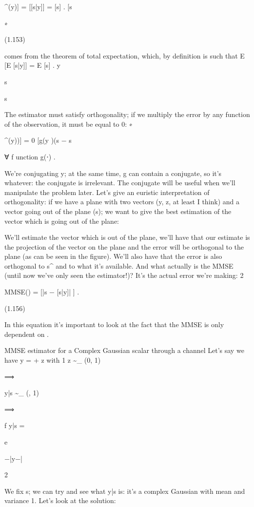 {^(y)] = [[s|y]] = [s] .
[s

∗

(1.153)

comes from the theorem of total expectation, which, by definition is such that E [E [s|y]] = E [s] .
y

s

s

The estimator must satisfy orthogonality; if we multiply the error by any function of the observation, it must be equal to 0:
∗

^(y))] = 0 [g(y )(s − s

∀ f unction g(⋅) .

We're conjugating y; at the same time, g can contain a conjugate, so it's whatever:
the conjugate is irrelevant.
The conjugate will be useful when we'll manipulate the problem later.
Let's give an euristic interpretation of orthogonality: if we have a plane with two vectors (y, z, at least I think) and a vector going out of the plane (s); we want to give the best estimation of the vector which is going out of the plane:

We'll estimate the vector which is out of the plane, we'll have that our estimate is the projection of the vector on the plane and the error will be orthogonal to the plane (as can be seen in the figure).
We'll also have that the error is also orthogonal to s^ and to what it's available.
And what actually is the MMSE (until now we've only seen the estimator!)? It's the actual error we're making:
2

MMSE(\rho) = [|s − [s|y]| ] .

(1.156)

In this equation it's important to look at the fact that the MMSE is only dependent on \rho.

MMSE estimator for a Complex Gaussian scalar through a channel Let's say we have y = \sqrt{\rhos} + z with 1 z \sim {}_{} (0, 1)

⟹

y|s \sim {}_{} (\sqrt{\rhos}, 1)

⟹

f y|s =

e

−|y−\sqrt{\rhos}|

2

\pi

We fix s; we can try and see what y|s is: it's a complex Gaussian with mean \sqrt{\rhos} and variance 1.
Let's look at the solution:

}
